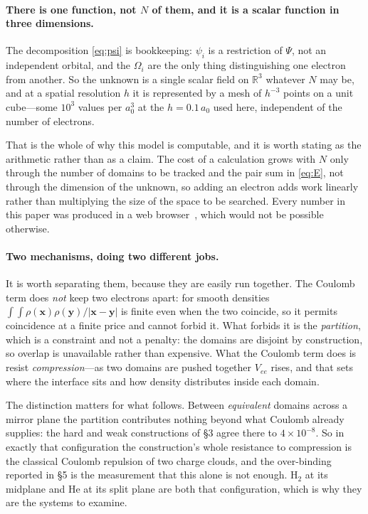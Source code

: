 \documentclass[11pt,a4paper]{article}
\begin{document}
\paragraph{There is one function, not $N$ of them, and it is a scalar function in three
dimensions.} The decomposition \eqref{eq:psi} is bookkeeping: $\psi_i$ is a restriction of $\Psi$,
not an independent orbital, and the $\Omega_i$ are the only thing distinguishing one electron from
another. So the unknown is a single scalar field on $\mathbb R^3$ whatever $N$ may be, and at a
spatial resolution $h$ it is represented by a mesh of $h^{-3}$ points on a unit cube---some
$10^3$ values per $a_0^3$ at the $h = 0.1\,a_0$ used here, independent of the number of electrons.

That is the whole of why this model is computable, and it is worth stating as the arithmetic rather
than as a claim. The cost of a calculation grows with $N$ only through the number of domains to be
tracked and the pair sum in \eqref{eq:E}, not through the dimension of the unknown, so adding an
electron adds work linearly rather than multiplying the size of the space to be searched. Every
number in this paper was produced in a web browser~\cite{code}, which would not be possible
otherwise.

\paragraph{Two mechanisms, doing two different jobs.} It is worth separating them, because they are
easily run together. The Coulomb term does \emph{not} keep two electrons apart: for smooth densities
$\int\!\!\int \rho(\mathbf x)\rho(\mathbf y)/|\mathbf x - \mathbf y|$ is finite even when the two
coincide, so it permits coincidence at a finite price and cannot forbid it. What forbids it is the
\emph{partition}, which is a constraint and not a penalty: the domains are disjoint by construction,
so overlap is unavailable rather than expensive. What the Coulomb term does is resist
\emph{compression}---as two domains are pushed together $V_{ee}$ rises, and that sets where the
interface sits and how density distributes inside each domain.

The distinction matters for what follows. Between \emph{equivalent} domains across a mirror plane
the partition contributes nothing beyond what Coulomb already supplies: the hard and weak
constructions of \S3 agree there to $4\times 10^{-8}$. So in exactly that configuration the
construction's whole resistance to compression is the classical Coulomb repulsion of two charge
clouds, and the over-binding reported in \S5 is the measurement that this alone is not enough.
H$_2$ at its midplane and He at its split plane are both that configuration, which is why they are
the systems to examine.
\end{document}
